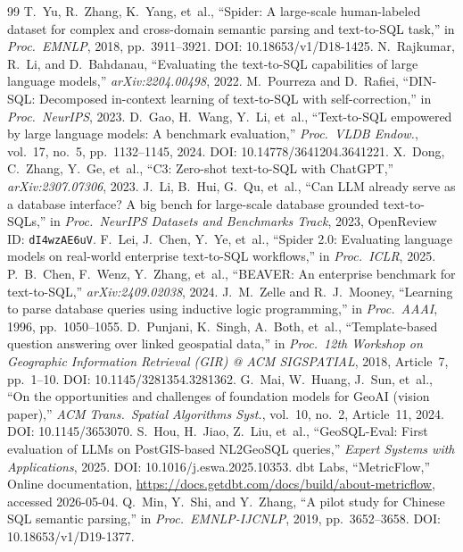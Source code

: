 \documentclass[11pt]{article}
\begin{document}
\begin{thebibliography}{99}
 T.~Yu, R.~Zhang, K.~Yang, et~al., ``Spider: A large-scale human-labeled dataset for complex and cross-domain semantic parsing and text-to-SQL task,'' in \emph{Proc.\ EMNLP}, 2018, pp.~3911--3921. DOI: 10.18653/v1/D18-1425.
 N.~Rajkumar, R.~Li, and D.~Bahdanau, ``Evaluating the text-to-SQL capabilities of large language models,'' \emph{arXiv:2204.00498}, 2022.
 M.~Pourreza and D.~Rafiei, ``DIN-SQL: Decomposed in-context learning of text-to-SQL with self-correction,'' in \emph{Proc.\ NeurIPS}, 2023.
 D.~Gao, H.~Wang, Y.~Li, et~al., ``Text-to-SQL empowered by large language models: A benchmark evaluation,'' \emph{Proc.\ VLDB Endow.}, vol.~17, no.~5, pp.~1132--1145, 2024. DOI: 10.14778/3641204.3641221.
 X.~Dong, C.~Zhang, Y.~Ge, et~al., ``C3: Zero-shot text-to-SQL with ChatGPT,'' \emph{arXiv:2307.07306}, 2023.
 J.~Li, B.~Hui, G.~Qu, et~al., ``Can LLM already serve as a database interface? A big bench for large-scale database grounded text-to-SQLs,'' in \emph{Proc.\ NeurIPS Datasets and Benchmarks Track}, 2023, OpenReview ID: \texttt{dI4wzAE6uV}.
 F.~Lei, J.~Chen, Y.~Ye, et~al., ``Spider 2.0: Evaluating language models on real-world enterprise text-to-SQL workflows,'' in \emph{Proc.\ ICLR}, 2025.
 P.~B.~Chen, F.~Wenz, Y.~Zhang, et~al., ``BEAVER: An enterprise benchmark for text-to-SQL,'' \emph{arXiv:2409.02038}, 2024.
 J.~M.~Zelle and R.~J.~Mooney, ``Learning to parse database queries using inductive logic programming,'' in \emph{Proc.\ AAAI}, 1996, pp.~1050--1055.
 D.~Punjani, K.~Singh, A.~Both, et~al., ``Template-based question answering over linked geospatial data,'' in \emph{Proc.\ 12th Workshop on Geographic Information Retrieval (GIR) @ ACM SIGSPATIAL}, 2018, Article~7, pp.~1--10. DOI: 10.1145/3281354.3281362.
 G.~Mai, W.~Huang, J.~Sun, et~al., ``On the opportunities and challenges of foundation models for GeoAI (vision paper),'' \emph{ACM Trans.\ Spatial Algorithms Syst.}, vol.~10, no.~2, Article~11, 2024. DOI: 10.1145/3653070.
 S.~Hou, H.~Jiao, Z.~Liu, et~al., ``GeoSQL-Eval: First evaluation of LLMs on PostGIS-based NL2GeoSQL queries,'' \emph{Expert Systems with Applications}, 2025. DOI: 10.1016/j.eswa.2025.10353.
 dbt Labs, ``MetricFlow,'' Online documentation, \url{https://docs.getdbt.com/docs/build/about-metricflow}, accessed 2026-05-04.
 Q.~Min, Y.~Shi, and Y.~Zhang, ``A pilot study for Chinese SQL semantic parsing,'' in \emph{Proc.\ EMNLP-IJCNLP}, 2019, pp.~3652--3658. DOI: 10.18653/v1/D19-1377.
\end{thebibliography}
\appendix
\end{document}

